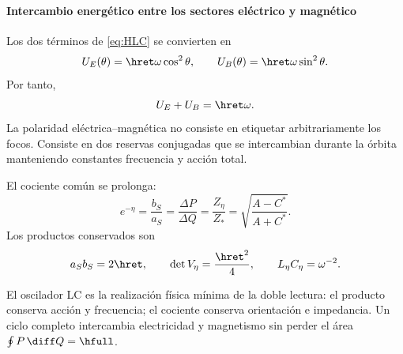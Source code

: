 \paragraph{Intercambio energético entre los sectores eléctrico y magnético}

Los dos términos de \eqref{eq:HLC} se convierten en
\begin{equation}
U_E(\theta)=\hret\omega\cos^2\theta,
\qquad
U_B(\theta)=\hret\omega\sin^2\theta.
\label{eq:energy-exchange}
\end{equation}
Por tanto,
\[
U_E+U_B=\hret\omega.
\]
La polaridad eléctrica--magnética no consiste en etiquetar arbitrariamente
los focos. Consiste en dos reservas conjugadas que se intercambian durante la
órbita manteniendo constantes frecuencia y acción total.

El cociente común se prolonga:
\begin{equation}
\boxed{
e^{-\eta}
=\frac{b_S}{a_S}
=\frac{\Delta P}{\Delta Q}
=\frac{Z_\eta}{Z_*}
=\sqrt{\frac{A-C^*}{A+C^*}}.}
\label{eq:shape-chain-LC}
\end{equation}
Los productos conservados son
\[
a_Sb_S=2\hret,\qquad
\det V_\eta=\frac{\hret^2}{4},
\qquad
L_\eta C_\eta=\omega^{-2}.
\]

\begin{exactbox}
El oscilador LC es la realización física mínima de la doble lectura: el
producto conserva acción y frecuencia; el cociente conserva orientación e
impedancia. Un ciclo completo intercambia electricidad y magnetismo sin
perder el área \(\oint P\,\diff Q=\hfull\).
\end{exactbox}

